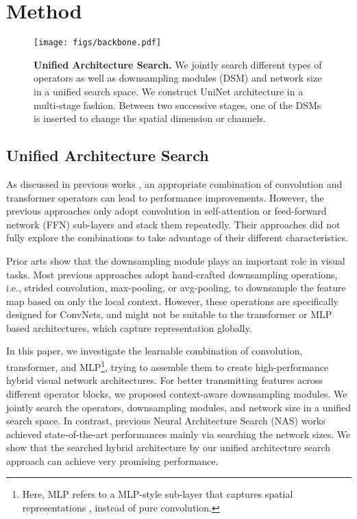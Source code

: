 \documentclass[runningheads]{llncs}
\begin{document}
\section{Method}
\label{method}


\begin{figure*}[t]
    \centering
    \texttt{[image: figs/backbone.pdf]}
\caption{\textbf{Unified Architecture Search.} We jointly search different types of operators as well as downsampling modules (DSM) and network size in a unified search space. We construct UniNet architecture in a multi-stage fashion. Between two successive stages, one of the DSMs is inserted to change the spatial dimension or channels.}
    \label{fig:backbone}
\end{figure*}

\subsection{Unified Architecture Search}
\label{sec:uas}

As discussed in previous works \cite{convit}, an appropriate combination of convolution and transformer operators can lead to performance improvements. 
However, the previous approaches \cite{cvt,yuan2021incorporating} only adopt convolution in self-attention or feed-forward network (FFN) sub-layers and stack them repeatedly. Their approaches did not fully explore the combinations to take advantage of their different characteristics.


Prior arts \cite{carafe++,zhang2019shiftinvar} show that the downsampling module plays an important role in visual tasks. Most previous approaches adopt hand-crafted downsampling operations, i.e., strided convolution, max-pooling, or avg-pooling, to downsample the feature map based on only the local context. However, these operations are specifically designed for ConvNets, and might not be suitable to the transformer or MLP based architectures, which capture representation globally. 

In this paper, we investigate the learnable combination of convolution, transformer, and MLP\footnote{Here, MLP refers to a MLP-style sub-layer that captures spatial representations \cite{mixer,resmlp,vip}, instead of pure  convolution.}, trying to assemble them to create high-performance hybrid visual network architectures. For better transmitting features across different operator blocks, we proposed context-aware downsampling modules. We jointly search the operators, downsampling modules, and network size in a unified search space. In contrast, previous Neural Architecture Search (NAS) works achieved state-of-the-art performances mainly via searching the network sizes. We show that the searched hybrid architecture by our unified architecture search approach can achieve very promising performance.
\end{document}
